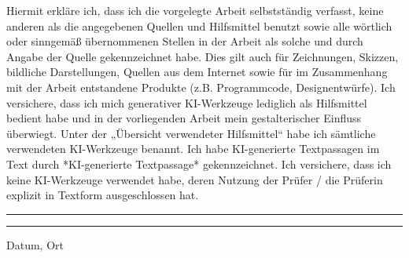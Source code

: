 \thispagestyle{empty}
Hiermit erkläre ich, dass ich die vorgelegte Arbeit selbstständig verfasst, keine anderen als die
angegebenen Quellen und Hilfsmittel benutzt sowie alle wörtlich oder sinngemäß übernommenen
Stellen in der Arbeit als solche und durch Angabe der Quelle gekennzeichnet habe. Dies gilt auch für
Zeichnungen, Skizzen, bildliche Darstellungen, Quellen aus dem Internet sowie für im
Zusammenhang mit der Arbeit entstandene Produkte (z.B. Programmcode, Designentwürfe).\newline
Ich versichere, dass ich mich generativer KI-Werkzeuge lediglich als Hilfsmittel bedient habe
und in der vorliegenden Arbeit mein gestalterischer Einfluss überwiegt. Unter der „Übersicht
verwendeter Hilfsmittel“ habe ich sämtliche verwendeten KI-Werkzeuge benannt. Ich habe KI-generierte Textpassagen im Text durch *KI-generierte Textpassage* gekennzeichnet. Ich versichere, dass ich keine KI-Werkzeuge verwendet habe,
deren Nutzung der Prüfer / die Prüferin explizit in Textform ausgeschlossen hat.
\\
[4cm]
\noindent\rule{5cm}{.4pt}\hfill\rule{5cm}{.4pt}\par
\noindent Datum, Ort \hfill \autor \\
